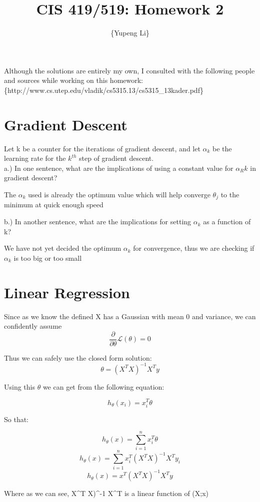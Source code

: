 \documentclass{article}
\title{CIS 419/519: Homework 2}
\author{\{Yupeng Li\}}
\date{}
\begin{document}
    \maketitle
    Although the solutions are entirely my own, I consulted with the following people and sources while working on this homework:
     \{http://www.cs.utep.edu/vladik/cs5315.13/cs5315\_13kader.pdf\}
    
    \section{Gradient Descent}
    
    Let k be a counter for the iterations of gradient descent, and let $\alpha_{k}$ be the learning rate for the $k^{th}$ step of gradient descent.\\
    
    
a.) In one sentence, what are the implications of using a constant value for $\alpha_R{k}$ in gradient descent?


The $\alpha_{k}$ used is already the optimum value which will help converge $\theta_{j}$ to the minimum at quick enough speed 


b.) In another sentence, what are the implications for setting $\alpha_{k}$ as a function of k?

We have not yet decided the optimum $\alpha_k$ for convergence, thus we are checking if $\alpha_k$ is too big or too small



    
    
    \section{Linear Regression}
Since as we know the defined X has a Gaussian with mean 0 and variance, we can confidently assume
\[\frac{\partial}{\partial \theta}\mathcal{L}(\theta) = 0 \]

Thus we can safely use the closed form solution:
\[\theta =  (X^{T} X)^{-1} X^{T} y\]

Using this $\theta$ we can get from the following equation:

\[h_{\theta}(x_{i}) = x_{i}^{T} \theta\]

So that:

\[h_{\theta}(x) = \sum_{i=1}^{n}  x_{i}^{T} \theta\]
\[h_{\theta}(x) = \sum_{i=1}^{n}  x_{i}^{T} (X^{T} X)^{-1} X^{T} y_{i}\]
\[h_{\theta}(x) = x^{T} (X^{T} X)^{-1} X^{T} y\]

Where as we can see, X^{T} X)^{-1} X^{T} is a linear function of (X;x)
\end{document}
